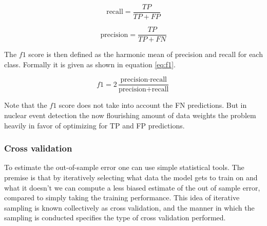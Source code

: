 \begin{equation}\label{eq:recall}
\text{recall}= \frac{TP}{TP + FP}
\end{equation}

\begin{equation}\label{eq:precision}
\text{precision} = \frac{TP}{TP + FN}
\end{equation}

\noindent The $f1$ score is then defined as the harmonic mean of precision and recall for each class. Formally it is given as shown in equation \ref{eq:f1}.

\begin{equation}\label{eq:f1}
f1 = 2 \frac{\text{precision} \cdot \text{recall}}{\text{precision} + \text{recall}}
\end{equation}

\noindent Note that the $f1$ score does not take into account the FN predictions. But in nuclear event detection the now flourishing amount of data weights the problem heavily in favor of optimizing for TP and FP predictions. 

\subsubsection{Cross validation}

To estimate the out-of-sample error one can use simple statistical tools. The premise is that by iteratively selecting what data the model gets to train on and what it doesn't we can compute a less biased estimate of the out of sample error, compared to simply taking the training performance. This idea of iterative sampling is known collectively as cross validation, and the manner in which the sampling is conducted specifies the type of cross validation performed. 	